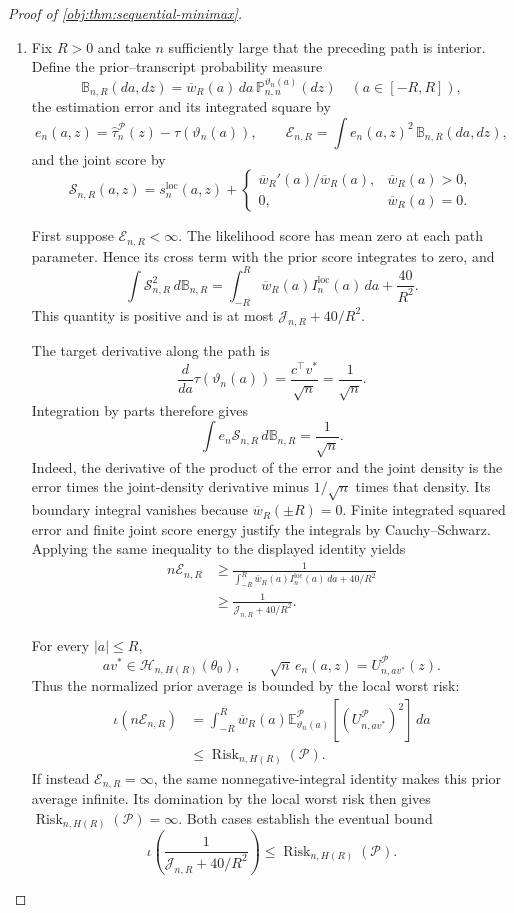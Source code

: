 \documentclass[11pt]{article}
\begin{document}
\begin{proof}[Proof of \cref{obj:thm:sequential-minimax}]
\begin{enumerate}
\item
Fix \(R>0\) and take \(n\) sufficiently large that the preceding path is interior. Define the prior--transcript probability measure
\[
\mathbb B_{n,R}(da,dz)
=
\overline w_R(a)\,da\,
\mathbb P_{n,n}^{\vartheta_n(a)}(dz)
\quad(a\in[-R,R]),
\]
the estimation error and its integrated square by
\[
e_n(a,z)=\widehat\tau_n^{\mathcal P}(z)-\tau(\vartheta_n(a)),
\qquad
\mathcal E_{n,R}=\int e_n(a,z)^2\,\mathbb B_{n,R}(da,dz),
\]
and the joint score by
\[
\mathscr S_{n,R}(a,z)
=
s_n^{\mathrm{loc}}(a,z)
+
\begin{cases}
\overline w_R'(a)/\overline w_R(a),&\overline w_R(a)>0,\\
0,&\overline w_R(a)=0.
\end{cases}
\]

First suppose \(\mathcal E_{n,R}<\infty\). The likelihood score has mean zero at each path parameter. Hence its cross term with the prior score integrates to zero, and
\[
\int\mathscr S_{n,R}^2\,d\mathbb B_{n,R}
=
\int_{-R}^{R}\overline w_R(a)I_n^{\mathrm{loc}}(a)\,da
+
\frac{40}{R^2}.
\]
This quantity is positive and is at most \(\mathcal J_{n,R}+40/R^2\).

The target derivative along the path is
\[
\frac{d}{da}\tau(\vartheta_n(a))
=
\frac{c^\top v^*}{\sqrt n}
=
\frac1{\sqrt n}.
\]
Integration by parts therefore gives
\[
\int e_n\mathscr S_{n,R}\,d\mathbb B_{n,R}
=
\frac1{\sqrt n}.
\]
Indeed, the derivative of the product of the error and the joint density is the error times the joint-density derivative minus \(1/\sqrt n\) times that density. Its boundary integral vanishes because \(\overline w_R(\pm R)=0\). Finite integrated squared error and finite joint score energy justify the integrals by Cauchy--Schwarz. Applying the same inequality to the displayed identity yields
\[
\begin{aligned}
n\mathcal E_{n,R}
&\ge
\frac{1}{
\displaystyle
\int_{-R}^{R}\overline w_R(a)I_n^{\mathrm{loc}}(a)\,da
+40/R^2}\\
&\ge
\frac1{\mathcal J_{n,R}+40/R^2}.
\end{aligned}
\]

For every \(|a|\le R\),
\[
av^*\in\mathcal H_{n,H(R)}(\theta_0),
\qquad
\sqrt n\,e_n(a,z)=U_{n,av^*}^{\mathcal P}(z).
\]
Thus the normalized prior average is bounded by the local worst risk:
\[
\begin{aligned}
\iota(n\mathcal E_{n,R})
&=
\int_{-R}^{R}\overline w_R(a)
\mathbb E_{\vartheta_n(a)}^{\mathcal P}
\!\left[(U_{n,av^*}^{\mathcal P})^2\right]\,da\\
&\le \operatorname{Risk}_{n,H(R)}(\mathcal P).
\end{aligned}
\]
If instead \(\mathcal E_{n,R}=\infty\), the same nonnegative-integral identity makes this prior average infinite. Its domination by the local worst risk then gives
\(\operatorname{Risk}_{n,H(R)}(\mathcal P)=\infty\).
Both cases establish the eventual bound
\[
\iota\!\left(\frac1{\mathcal J_{n,R}+40/R^2}\right)
\le
\operatorname{Risk}_{n,H(R)}(\mathcal P).
\]


\end{enumerate}
\end{proof}
\end{document}
